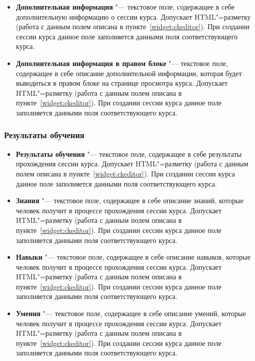 \begin{itemize}
		\item \textbf{Дополнительная информация} "--- текстовое поле, содержащее в себе дополнительную информацию о сессии курса. Допускает HTML"=разметку (работа с данным полем описана в пункте~\ref{widget:ckeditor}). При создании сессии курса данное поле заполняется данными поля  соответствующего курса.
		
		\item \textbf{Дополнительная информация в правом блоке} "--- текстовое поле, содержащее в себе описание дополнительной информации, которая будет выводиться в правом блоке на странице просмотра курса. Допускает HTML"=разметку (работа с данным полем описана в пункте~\ref{widget:ckeditor}). При создании сессии курса данное поле заполняется данными поля  соответствующего курса.
	\end{itemize}

\subsubsection{Результаты обучения}
	\begin{itemize}
		\item \textbf{Результаты обучения} "--- текстовое поле, содержащее в себе результаты прохождения сессии курса. Допускает HTML"=разметку (работа с данным полем описана в пункте~\ref{widget:ckeditor}). При создании сессии курса данное поле заполняется данными поля  соответствующего курса.
		
		\item \textbf{Знания} "--- текстовое поле, содержащее в себе описание знаний, которые человек получит в процессе прохождения сессии курса. Допускает HTML"=разметку (работа с данным полем описана в пункте~\ref{widget:ckeditor}). При создании сессии курса данное поле заполняется данными поля  соответствующего курса.
		
		\item \textbf{Навыки} "--- текстовое поле, содержащее в себе описание навыков, которые человек получит в процессе прохождения сессии курса. Допускает HTML"=разметку (работа с данным полем описана в пункте~\ref{widget:ckeditor}). При создании сессии курса данное поле заполняется данными поля  соответствующего курса.
		
		\item \textbf{Умения} "--- текстовое поле, содержащее в себе описание умений, которые человек получит в процессе прохождения сессии курса. Допускает HTML"=разметку (работа с данным полем описана в пункте~\ref{widget:ckeditor}). При создании сессии курса данное поле заполняется данными поля  соответствующего курса.
	\end{itemize}


